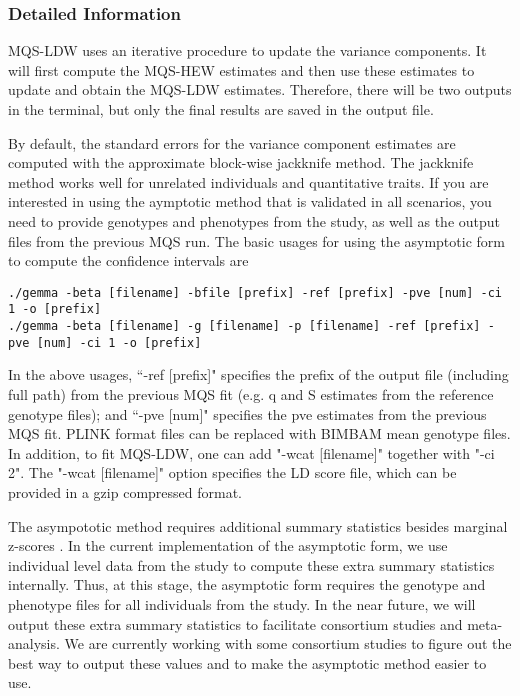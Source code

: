 \documentclass[11pt]{article}
\begin{document}
\subsubsection{Detailed Information}

MQS-LDW uses an iterative procedure to update the variance
components. It will first compute the MQS-HEW estimates and then use
these estimates to update and obtain the MQS-LDW estimates. Therefore,
there will be two outputs in the terminal, but only the final results
are saved in the output file.

By default, the standard errors for the variance component estimates
are computed with the approximate block-wise jackknife method.  The
jackknife method works well for unrelated individuals and quantitative
traits. If you are interested in using the aymptotic method that is
validated in all scenarios, you need to provide genotypes and
phenotypes from the study, as well as the output files from the
previous MQS run. The basic usages for using the asymptotic form to
compute the confidence intervals are

\begin{verbatim}
./gemma -beta [filename] -bfile [prefix] -ref [prefix] -pve [num] -ci 1 -o [prefix]
./gemma -beta [filename] -g [filename] -p [filename] -ref [prefix] -pve [num] -ci 1 -o [prefix]
\end{verbatim}

In the above usages, ``-ref [prefix]" specifies the prefix of the
output file (including full path) from the previous MQS fit (e.g. q
and S estimates from the reference genotype files); and ``-pve [num]"
specifies the pve estimates from the previous MQS fit. PLINK format
files can be replaced with BIMBAM mean genotype files. In addition, to
fit MQS-LDW, one can add "-wcat [filename]" together with "-ci 2". The
"-wcat [filename]" option specifies the LD score file, which can be
provided in a gzip compressed format.

The asympototic method requires additional summary statistics besides
marginal z-scores \cite{Zhou:2016}. In the current implementation of
the asymptotic form, we use individual level data from the study to
compute these extra summary statistics internally. Thus, at this
stage, the asymptotic form requires the genotype and phenotype files
for all individuals from the study. In the near future, we will output
these extra summary statistics to facilitate consortium studies and
meta-analysis. We are currently working with some consortium studies
to figure out the best way to output these values and to make the
asymptotic method easier to use.
\end{document}
